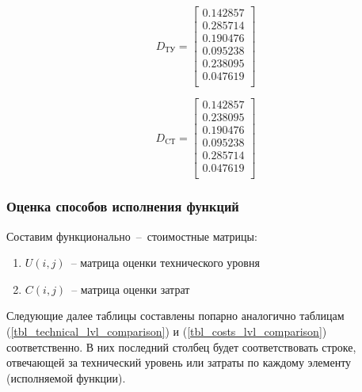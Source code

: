 \begin{equation}
    D_\text{ТУ} =
    \begin{bmatrix}
        0.142857 \\
        0.285714 \\
        0.190476 \\
        0.095238 \\
        0.238095 \\
        0.047619 \\
    \end{bmatrix}
    \label{eq_tu_matrix}
\end{equation}

\begin{equation}
    D_\text{CТ} =
    \begin{bmatrix}
        0.142857 \\
        0.238095 \\
        0.190476 \\
        0.095238 \\
        0.285714 \\
        0.047619 \\
    \end{bmatrix}
    \label{eq_st_matrix}
\end{equation}

\subsubsection{Оценка способов исполнения функций}
Составим функционально~--~стоимостные матрицы:
\begin{enumerate}
    \item $U(i,j)$~-- матрица оценки технического уровня
    \item $C(i,j)$~-- матрица оценки затрат
\end{enumerate}

Следующие далее таблицы составлены попарно аналогично таблицам
(\ref{tbl_technical_lvl_comparison}) и (\ref{tbl_costs_lvl_comparison})
соответственно. В них последний столбец будет соответствовать строке, отвечающей
за технический уровень или затраты по каждому элементу (исполняемой функции).


